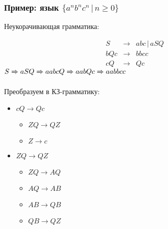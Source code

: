 \documentclass{beamer}
\newcommand{\derives}[0]{\xRightarrow[]{}}
\begin{document}
\begin{frame}[fragile]
  \transwipe[direction=90]
  \frametitle{Пример: язык $\{ a^n b^n c^n \, | \, n \geq 0 \}$}
  Неукорачивающая грамматика: 
  
$$
\begin{array}{crcl}
&S& \rightarrow & abc \, | \, a S Q \\
&bQc& \rightarrow & bbcc  \\
&cQ& \rightarrow & Qc 
\end{array}
$$ 
\pause
$S \derives a S Q \derives a a b c Q \derives aabQc \derives aabbcc$
\pause

\vfill

Преобразуем в КЗ-грамматику: \pause

\begin{itemize}
  \item $c Q \rightarrow Q c$
  \begin{itemize}
    \item $Z Q \rightarrow Q Z$
    \item $Z \rightarrow c$
  \end{itemize} \pause
  \item $Z Q \rightarrow Q Z$
  \begin{itemize}
    \item $Z Q \rightarrow A Q$
    \item $A Q \rightarrow A B$
    \item $A B \rightarrow Q B$
    \item $Q B \rightarrow Q Z$
  \end{itemize}
\end{itemize}
\end{frame}
\end{document}
